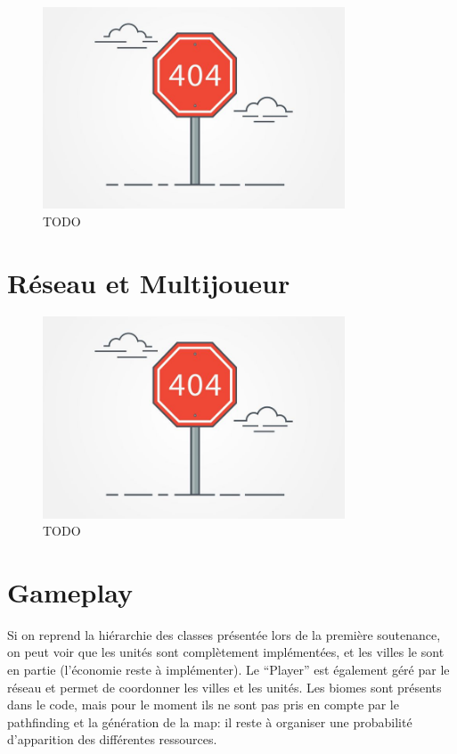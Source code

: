 \documentclass[12pt]{report}
\begin{document}
\begin{figure}[H]
    \centering
    \includegraphics[width=0.8\textwidth]{404}
    \caption{TODO}
\end{figure}

\section*{Réseau et Multijoueur}

\begin{figure}[H]
    \centering
    \includegraphics[width=0.8\textwidth]{404}
    \caption{TODO}
\end{figure}

\section*{Gameplay}

Si on reprend la hiérarchie des classes présentée lors de la première soutenance, on peut voir que les unités sont complètement implémentées, et les villes le sont en partie (l’économie reste à implémenter). Le “Player” est également géré par le réseau et permet de coordonner les villes et les unités. Les biomes sont présents dans le code, mais pour le moment ils ne sont pas pris en compte par le pathfinding et la génération de la map: il reste à organiser une probabilité d’apparition des différentes ressources.
\end{document}
